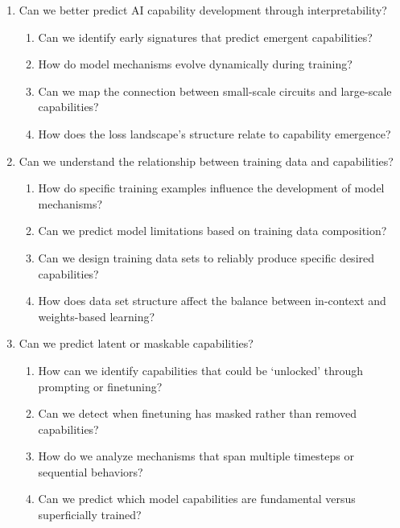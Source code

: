 \begin{enumerate}
    \item Can we better predict AI capability development through interpretability?
    \begin{enumerate}[label=\alph*.]
        \item Can we identify early signatures that predict emergent capabilities?
        \item How do model mechanisms evolve dynamically during training?
        \item Can we map the connection between small-scale circuits and large-scale capabilities?
        \item How does the loss landscape's structure relate to capability emergence?
    \end{enumerate}
    
    \item Can we understand the relationship between training data and capabilities?
    \begin{enumerate}[label=\alph*.]
        \item How do specific training examples influence the development of model mechanisms?
        \item Can we predict model limitations based on training data composition?
        \item Can we design training data sets to reliably produce specific desired capabilities?
        \item How does data set structure affect the balance between in-context and weights-based learning?
    \end{enumerate}
    
    \item Can we predict latent or maskable capabilities?
    \begin{enumerate}[label=\alph*.]
        \item How can we identify capabilities that could be `unlocked' through prompting or finetuning?
        \item Can we detect when finetuning has masked rather than removed capabilities?
        \item How do we analyze mechanisms that span multiple timesteps or sequential behaviors?
        \item Can we predict which model capabilities are fundamental versus superficially trained?
    \end{enumerate}
\end{enumerate}

